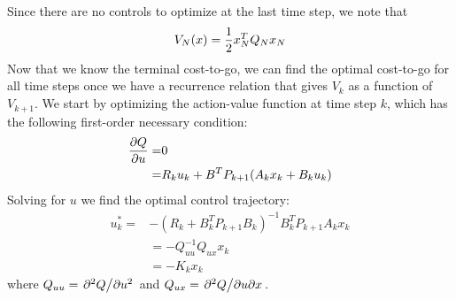 \documentclass[../root.tex]{subfiles}
\begin{document}
        Since there are no controls to optimize at the last time step, we note that
        \begin{equation} \label{eq:LQR_termcost}
            V_N(x) = \frac{1}{2} x_N^T Q_N x_N
        \end{equation}
        Now that we know the terminal cost-to-go, we can find the optimal
        cost-to-go for all time steps once we have a recurrence relation that
        gives $V_k$ as a function of $V_{k+1}$. We start by optimizing the
        action-value function at time step $k$, which has the following
        first-order necessary condition:
        \begin{equation}
        \begin{aligned}
            \pdv{Q}{u} =& 0 \\
            =& R_k u_k + B^T P_{k+1}(A_k x_k + B_k u_k) 
        \end{aligned}
        \end{equation}
        Solving for $u$ we find the optimal control trajectory:
        \begin{equation} \label{eq:LQR_gain}
            \begin{aligned}
            u_k^* =& -(R_k + B_k^T P_{k+1} B_k)^{-1} B_k^T P_{k+1} A_k x_k \\
            &= -Q_{uu}^{-1}Q_{ux} x_k \\
            &= -K_k x_k
            \end{aligned}
        \end{equation}
        where $Q_{uu} = \pdv*[2]{Q}{u}$ and $Q_{ux} = \pdv*{Q}{u}{x}$. 
\end{document}
